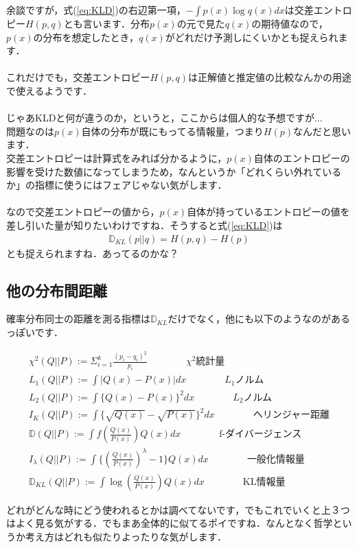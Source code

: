 \documentclass[11pt,a4paper]{ujreport}
\begin{document}
余談ですが，式(\ref{eq:KLD})の右辺第一項，$- \int p(x) \log q(x)dx$は交差エントロピー$H(p,q)$とも言います．分布$p(x)$の元で見た$q(x)$の期待値なので，$p(x)$の分布を想定したとき，$q(x)$がどれだけ予測しにくいかとも捉えられます．\\
\\

これだけでも，交差エントロピー$H(p,q)$は正解値と推定値の比較なんかの用途で使えるようです．\\
\\

じゃあKLDと何が違うのか，というと，ここからは個人的な予想ですが...\\

問題なのは$p(x)$自体の分布が既にもってる情報量，つまり$H(p)$なんだと思います．\\

交差エントロピーは計算式をみれば分かるように，$p(x)$自体のエントロピーの影響を受けた数値になってしまうため，なんというか「どれくらい外れているか」の指標に使うにはフェアじゃない気がします．\\
\\

なので交差エントロピーの値から，$p(x)$自体が持っているエントロピーの値を差し引いた量が知りたいわけですね．そうすると式(\ref{eq:KLD})は
\begin{eqnarray}
\mathbb{D}_{KL}(p||q) = H(p,q) - H(p)
\end{eqnarray}
とも捉えられますね．あってるのかな？

\subsection{他の分布間距離}
確率分布同士の距離を測る指標は$\mathbb{D}_{KL}$だけでなく，他にも以下のようなのがあるっぽいです\cite{dist}．
\begin{screen}
\begin{eqnarray}
\chi^2(Q||P) := \Sigma_{i=1}^k \frac{(p_i - q_i)^2}{p_i} \qquad \qquad  \text{$\chi^2$統計量}\\
L_1(Q||P) := \int |Q(x) - P(x)|dx   \qquad \qquad  \text{$L_1$ノルム} \\
L_2(Q||P) := \int\{ Q(x) - P(x)\}^2 dx   \qquad \qquad  \text{$L_2$ノルム}\\
I_K(Q||P) := \int \{ \sqrt{Q(x)} - \sqrt{P(x)} \}^2 dx    \qquad \qquad  \text{ヘリンジャー距離}\\
\mathbb{D}(Q||P) := \int f(\frac{Q(x)}{P(x)}) Q(x)dx   \qquad \qquad  \text{f-ダイバージェンス}\\
I_\lambda(Q||P) := \int \{ (\frac{Q(x)}{P(x)})^{\lambda} -1 \}Q(x) dx   \qquad \qquad  \text{一般化情報量}\\
\mathbb{D}_{KL}(Q||P) := \int \log(\frac{Q(x)}{P(x)})Q(x) dx   \qquad \qquad  \text{KL情報量}
\end{eqnarray}
\end{screen}
どれがどんな時にどう使われるとかは調べてないです，でもこれでいくと上３つはよく見る気がする．でもまあ全体的に似てるポイですね．なんとなく哲学というか考え方はどれも似たりよったりな気がします．
\end{document}
